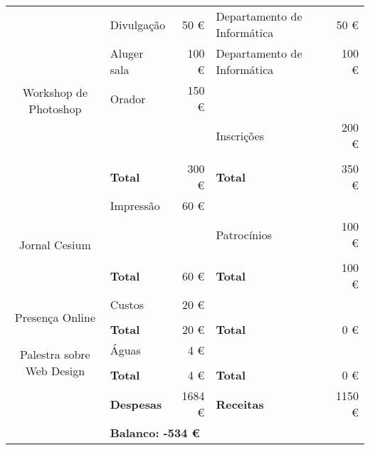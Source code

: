 \begin{center}
{\begin{tabular}{| c | l | r | l | r |}
\multirow{6}{*}{Workshop de Photoshop}
							& Divulgação		 	& 50 \euro		&  Departamento de Informática 	& 50 \euro			\\ \cline{2-5}
							& Aluger sala			& 100 \euro		& Departamento de Informática	& 100 \euro			\\ \cline{2-5}
							& Orador				& 150 \euro		&								&					\\ \cline{2-5}
							& 						& 				& Inscrições					& 200 \euro			\\ \cline{2-5}
							&						&				&								&					\\ \cline{2-5}
							& \textbf{Total}		& 300 \euro		& \textbf{Total}				& 350 \euro			\\ \cline{1-5} \hline

\multirow{4}{*}{Jornal Cesium}
							& Impressão				& 60 \euro		& 								&					\\ \cline{2-5}
							&						&				& Patrocínios					& 100 \euro			\\ \cline{2-5}
							&						&				&								&					\\ \cline{2-5}
							& \textbf{Total}		& 60 \euro		& \textbf{Total}				& 100 \euro			\\ \cline{1-5} \hline

\multirow{3}{*}{Presença Online}
							& Custos				& 20 \euro		& 								&					\\ \cline{2-5}
							&						&				&								&					\\ \cline{2-5}
							& \textbf{Total}		& 20 \euro		& \textbf{Total}				& 0 \euro			\\ \cline{1-5} \hline

\multirow{3}{*}{Palestra sobre Web Design}
							& Águas					& 4 \euro		& 								&					\\ \cline{2-5}
							&						&				&								&					\\ \cline{2-5}
							& \textbf{Total}		& 4 \euro		& \textbf{Total}				& 0 \euro			\\ \cline{1-5} \hline
\hline
							& \textbf{Despesas}		& 1684 \euro	& \textbf{Receitas}				& 1150 \euro		\\ \hline
							& \multicolumn{4}{|l|}{\textbf{Balanco: -534 \euro}}															\\ \hline
\end{tabular}
}

\end{center}

